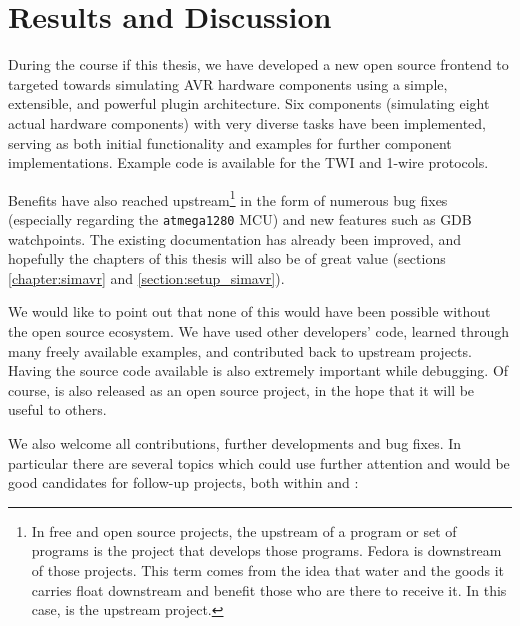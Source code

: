 
\chapter{Results and Discussion} \label{chapter:results}

During the course if this thesis, we have developed a new open source frontend
to \simavr targeted towards simulating \ac{AVR} hardware components using a
simple, extensible, and powerful plugin architecture. Six components (simulating
eight actual hardware components) with very diverse tasks have been implemented,
serving as both initial functionality and examples for further component
implementations. Example code is available for the \ac{TWI} and 1-wire protocols.

Benefits have also reached upstream\footnote{
%
In free and open source projects, the upstream of a program or set of
programs is the project that develops those programs. Fedora is downstream
of those projects. This term comes from the idea that water and the goods it
carries float downstream and benefit those who are there to receive it. \cite{fedora}
In this case, \simavr is the upstream project.
%
} in the form of numerous bug fixes (especially regarding the \verb|atmega1280|
\ac{MCU}) and new features such as \ac{GDB} watchpoints. The existing documentation
has already been improved, and hopefully the \simavr chapters of this thesis
will also be of great value (sections \ref{chapter:simavr} and \ref{section:setup_simavr}).

We would like to point out that none of this would have been possible without
the open source ecosystem. We have used other developers' code, learned through
many freely available examples, and contributed back to upstream projects.
Having the source code available is also extremely important while debugging.
Of course, \qsimavr is also released as an open source project, in the hope
that it will be useful to others.

We also welcome all contributions, further developments and bug fixes. In particular
there are several topics which could use further attention and would be good
candidates for follow-up projects, both within \qsimavr and \simavr:

